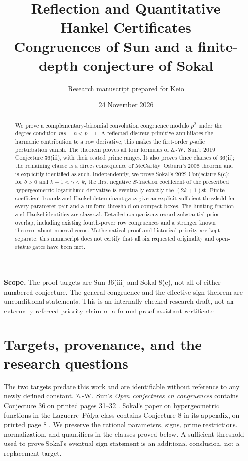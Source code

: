 \documentclass[11pt,a4paper]{article}
\title{\vspace{-1cm}\color{ink}\bfseries Reflection and Quantitative\\[3pt]
 Hankel Certificates\\[8pt]\large Congruences of Sun and a finite-depth conjecture of Sokal}
\author{Research manuscript prepared for Keio}
\date{24 November 2026}
\theoremstyle{remark}
\begin{document}
\maketitle
\begin{abstract}
We prove a complementary-binomial convolution congruence modulo $p^2$
under the degree condition $ms+h<p-1$. A reflected discrete primitive
annihilates the harmonic contribution to a row derivative; this makes
the first-order $p$-adic perturbation vanish. The theorem proves all four
formulas of Z.-W.~Sun's 2019 Conjecture 36(iii), with their stated prime
ranges. It also proves three clauses of 36(ii); the remaining clause is
a direct consequence of McCarthy--Osburn's 2008 theorem and is explicitly
identified as such. Independently, we prove Sokal's 2022 Conjecture 8(c):
for $b>0$ and $k-1<\gamma<k$, the first negative $S$-fraction coefficient
of the prescribed hypergeometric logarithmic derivative is eventually
exactly the $(2k+1)$st. Finite coefficient bounds and Hankel determinant
gaps give an explicit sufficient threshold for every parameter pair and
a uniform threshold on compact boxes. The limiting fraction and Hankel
identities are classical. Detailed comparisons record substantial prior
overlap, including existing fourth-power row congruences and a stronger
known theorem about nonreal zeros. Mathematical proof and historical
priority are kept separate: this manuscript does not certify that all
six requested originality and open-status gates have been met.
\end{abstract}
\vspace{5pt}
\noindent\colorbox{pale}{\parbox{\dimexpr\linewidth-2\fboxsep\relax}{%
\small\textbf{Scope.} The proof targets are Sun 36(iii) and Sokal 8(c),
not all of either numbered conjecture. The general congruence and the
effective sign theorem are unconditional statements. This is an
internally checked research draft, not an externally refereed priority
claim or a formal proof-assistant certificate.}}
\newpage
\tableofcontents
\newpage

\section{Targets, provenance, and the research questions}
\label{sec:scope}

The two targets predate this work and are identifiable without reference
to any newly defined constant. Z.-W.~Sun's \emph{Open conjectures on
congruences} contains Conjecture 36 on printed pages 31--32
\cite{sun2019}. Sokal's paper on hypergeometric functions in the
Laguerre--P\'olya class contains Conjecture 8 in its appendix, on printed
page 8 \cite{sokal2022}. We preserve the rational parameters, signs,
prime restrictions, normalization, and quantifiers in the clauses
proved below. A sufficient threshold used to prove Sokal's eventual
sign statement is an additional conclusion, not a replacement target.
\end{document}

